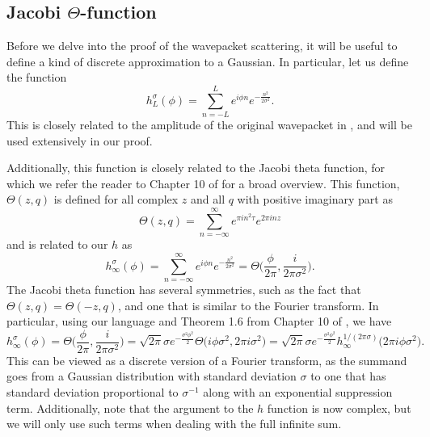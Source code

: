 \documentclass[../thesis-main/thesis-main]{subfiles}
\begin{document}
\subsection{Jacobi $\Theta$-function}

Before we delve into the proof of the wavepacket scattering, it will be useful to define a kind of discrete approximation to a Gaussian.  In particular, let us define the function
\begin{equation}
  h_L^\sigma(\phi) = \sum_{n = -L}^L e^{i \phi n} e^{-\frac{ n^2}{2\sigma^2}}. 
  \label{eq:h_L_defn}
\end{equation}
This is closely related to the amplitude of the original wavepacket in , and will be used extensively in our proof.

Additionally, this function is closely related to the Jacobi theta function, for which we refer the reader to Chapter 10 of \cite{SSCA} for a broad overview.  This function, $\Theta(z,q)$ is defined for all complex $z$ and all $q$ with positive imaginary part as
\begin{equation}
  \Theta(z,q) = \sum_{n = -\infty}^\infty e^{ \pi i n^2 \tau} e^{ 2\pi  i n z}
\end{equation}
 and is related to our $h$ as 
\begin{equation}
  h_{\infty}^\sigma(\phi) = \sum_{n = -\infty}^\infty e^{ i \phi n} e^{ - \frac{ n^2}{2\sigma^2}} = \Theta\Bigg(\frac{\phi}{2\pi}, \frac{i}{2\pi \sigma^2} \Bigg).
\end{equation}
The Jacobi theta function has several symmetries, such as the fact that $\Theta(z,q) = \Theta(-z, q)$, and one that is similar to the Fourier transform.  In particular, using our language and Theorem 1.6 from Chapter 10 of \cite{SSCA}, we have
\begin{equation}
  h_{\infty}^\sigma (\phi) = \Theta\Bigg(\frac{\phi}{2\pi}, \frac{i}{2\pi \sigma^2} \Bigg) = \sqrt{2\pi} \sigma e^{ - \frac{\sigma^2\phi^2}{2}} \Theta \big(i \phi\sigma^2, 2\pi i \sigma^2 \big) =  \sqrt{2\pi} \sigma e^{ - \frac{\sigma^2\phi^2}{2}}  h_{\infty}^{1/(2\pi \sigma)}\big(2\pi i \phi \sigma^2 \big).
  \label{eq:discrete_fourier_transform}
\end{equation}
This can be viewed as a discrete version of a Fourier transform, as the summand goes from a Gaussian distribution with standard deviation $\sigma$ to one that has standard deviation proportional to $\sigma^{-1}$ along with an exponential suppression term.  Additionally, note that the argument to the $h$ function is now complex, but we will only use such terms when dealing with the full infinite sum.
\end{document}
